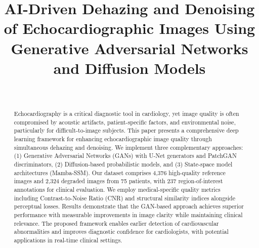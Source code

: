 \documentclass[10pt,conference,letterpaper]{IEEEtran}
\begin{document}
\title{AI-Driven Dehazing and Denoising of Echocardiographic Images Using Generative Adversarial Networks and Diffusion Models}

\author{%
  \\[1em]
}

\maketitle

\thispagestyle{plain}
\pagestyle{plain}

\begin{abstract}
  Echocardiography is a critical diagnostic tool in cardiology, yet image quality is often compromised by acoustic artifacts, patient-specific factors, and environmental noise, particularly for difficult-to-image subjects. This paper presents a comprehensive deep learning framework for enhancing echocardiographic image quality through simultaneous dehazing and denoising. We implement three complementary approaches: (1) Generative Adversarial Networks (GANs) with U-Net generators and PatchGAN discriminators, (2) Diffusion-based probabilistic models, and (3) State-space model architectures (Mamba-SSM). Our dataset comprises 4,376 high-quality reference images and 2,324 degraded images from 75 patients, with 237 region-of-interest annotations for clinical evaluation. We employ medical-specific quality metrics including Contrast-to-Noise Ratio (CNR) and structural similarity indices alongside perceptual losses. Results demonstrate that the GAN-based approach achieves superior performance with measurable improvements in image clarity while maintaining clinical relevance. The proposed framework enables earlier detection of cardiovascular abnormalities and improves diagnostic confidence for cardiologists, with potential applications in real-time clinical settings.
\end{abstract}
\end{document}
